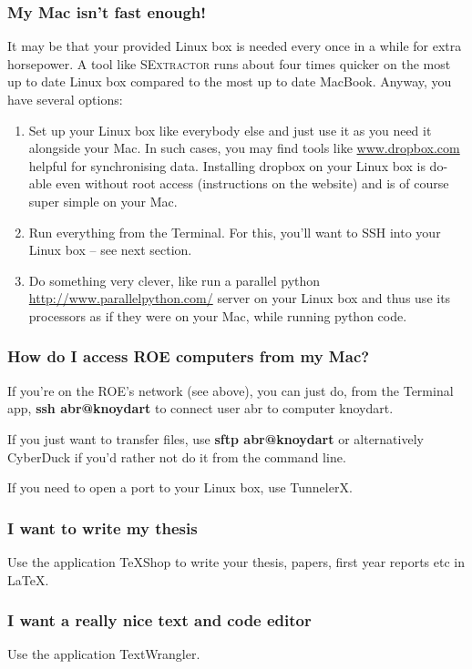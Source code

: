 \subsubsection{My Mac isn't fast enough!}
It may be that your provided Linux box is needed every once in a while for extra horsepower. A tool like \textsc{SExtractor} runs about four times quicker on the most up to date Linux box compared to the most up to date MacBook. Anyway, you have several options:
\begin{enumerate}
\item Set up your Linux box like everybody else and just use it as you need it alongside your Mac. In such cases, you may find tools like \url{www.dropbox.com} helpful for synchronising data. Installing dropbox on your Linux box is do-able even without root access (instructions on the website) and is of course super simple on your Mac.
\item Run everything from the Terminal. For this, you'll want to SSH into your Linux box -- see next section.
\item Do something very clever, like run a parallel python \url{http://www.parallelpython.com/} server on your Linux box and thus use its processors as if they were on your Mac, while running python code.
\end{enumerate}

\subsubsection{How do I access ROE computers from my Mac?}
If you're on the ROE's network (see above), you can just do, from the Terminal app,
{\bf ssh abr@knoydart}
to connect user abr to computer knoydart.

If you just want to transfer files, use {\bf sftp abr@knoydart} or alternatively CyberDuck if you'd rather not do it from the command line.

If you need to open a port to your Linux box, use TunnelerX.

\subsubsection{I want to write my thesis}
Use the application TeXShop to write your thesis, papers, first year reports etc in \LaTeX.

\subsubsection{I want a really nice text and code editor}
Use the application TextWrangler.

